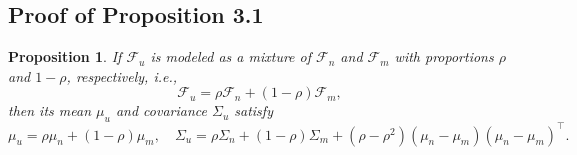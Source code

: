 \documentclass{article}
\theoremstyle{plain}
\newtheorem{proposition}[theorem]{Proposition}
\theoremstyle{definition}
\theoremstyle{remark}
\begin{document}
\subsection{Proof of Proposition 3.1} \label{P3.1}
\begin{proposition}
If $\mathcal F_u$ is modeled as a mixture of $\mathcal F_n$ and $\mathcal F_m$ with proportions $\rho$ and $1-\rho$, respectively, i.e.,
\begin{equation}
    \mathcal F_u=\rho \mathcal F_n +(1-\rho)\mathcal F_m,
\end{equation}
then its mean $\mu_u$ and covariance $\Sigma_u$ satisfy
\begin{equation}
        \mu_u=\rho \mu_n+(1-\rho)\mu_m,\quad
        \Sigma_u=\rho \Sigma_n+(1-\rho)\Sigma_m
        +(\rho-\rho^2)(\mu_n-\mu_m)(\mu_n-\mu_m)^\top.
\end{equation}
\end{proposition}
\end{document}
